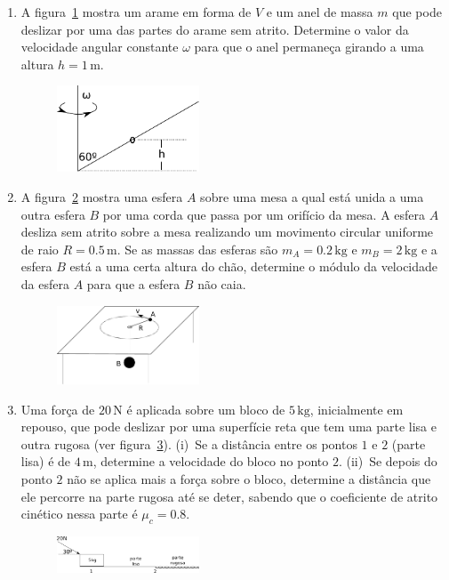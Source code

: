 \documentclass[twocolumn=on,DIV=calc]{scrartcl}
\newcommand{\un}[1]{\mathrm{#1}}
\begin{document}
\begin{enumerate}
\item A figura~\ref{fig:1} mostra um arame em forma de $V$ e um anel
  de massa $m$ que pode deslizar por uma das partes do arame sem
  atrito. Determine o valor da velocidade angular constante $\omega$
  para que o anel permaneça girando a uma altura $h=1\,\un{m}$.
  \begin{figure}[ht]
    \centering
    \includegraphics[width=0.4\textwidth,keepaspectratio]{lista5-questao1.pdf}
    \caption{}
    \label{fig:1}
  \end{figure}
\item A figura~\ref{fig:2} mostra uma esfera $A$ sobre uma mesa a qual
  está unida a uma outra esfera $B$ por uma corda que passa por um
  orifício da mesa. A esfera $A$ desliza sem atrito sobre a mesa
  realizando um movimento circular uniforme de raio
  $R=0.5\,\un{m}$. Se as massas das esferas são $m_A=0.2\,\un{kg}$ e
  $m_B=2\,\un{kg}$ e a esfera $B$ está a uma certa altura do chão,
  determine o módulo da velocidade da esfera $A$ para que a esfera $B$
  não caia.
  \begin{figure}[ht]
    \centering
    \includegraphics[width=0.4\textwidth,keepaspectratio]{lista5-questao2.pdf}
    \caption{}
    \label{fig:2}
  \end{figure}
\item Uma força de $20\,\un N$ é aplicada sobre um bloco de
  $5\,\un{kg}$, inicialmente em repouso, que pode deslizar por uma
  superfície reta que tem uma parte lisa e outra rugosa (ver
  figura~\ref{fig:3}). (i)~Se a distância entre os pontos $1$ e $2$
  (parte lisa) é de $4\,\un{m}$, determine a velocidade do bloco no
  ponto $2$. (ii)~Se depois do ponto $2$ não se aplica mais a força
  sobre o bloco, determine a distância que ele percorre na parte
  rugosa até se deter, sabendo que o coeficiente de atrito cinético
  nessa parte é $\mu_c=0.8$.
  \begin{figure}[ht]
    \centering
    \includegraphics[width=0.4\textwidth,keepaspectratio]{lista5-questao3.pdf}
    \caption{}
    \label{fig:3}
  \end{figure}
\end{enumerate}
\end{document}
